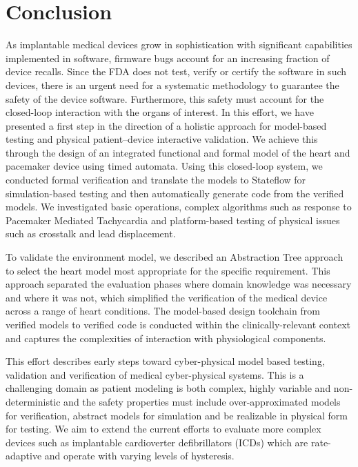 \section{Conclusion}
As implantable medical devices grow in sophistication with significant capabilities implemented in software, firmware bugs account for an increasing fraction of device recalls. Since the FDA  does not test, verify or certify the software in such devices, there is an urgent need for a systematic methodology to guarantee the safety of the device software. Furthermore, this safety must account for the closed-loop interaction with the organs of interest. In this effort, we have presented a first step in the direction of a holistic approach for model-based testing and physical patient--device interactive validation. We achieve this through the design of an integrated functional and formal model of the heart and pacemaker device using timed automata. Using this closed-loop system, we conducted formal verification and translate the models to Stateflow for simulation-based testing and then automatically generate code from the verified models. We investigated basic operations, complex algorithms such as response to Pacemaker Mediated Tachycardia and platform-based testing of physical issues such as crosstalk and lead displacement. 

To validate the environment model, we described an Abstraction Tree approach to select the heart model most appropriate for the specific requirement. This approach separated the evaluation phases where domain knowledge was necessary and where it was not, which simplified the verification of the medical device across a range of heart conditions. The model-based design toolchain from verified models to verified code is conducted within the clinically-relevant context and captures the complexities of interaction with physiological components. 

This effort describes early steps toward cyber-physical model based testing, validation and verification of medical cyber-physical systems. This is a challenging domain as patient modeling is both complex, highly variable and non-deterministic and the safety properties must include over-approximated models for verification, abstract models for simulation and be realizable in physical form for testing. We aim to extend the current efforts to evaluate more complex devices such as implantable cardioverter defibrillators (ICDs) which are rate-adaptive and operate with varying levels of hysteresis. 


